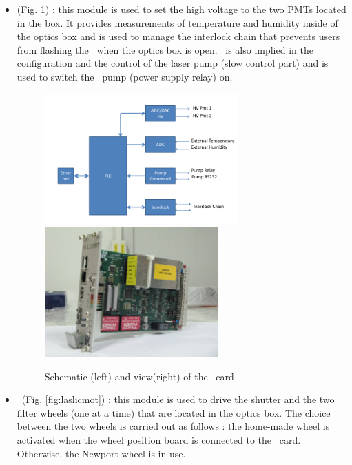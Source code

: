 \begin{itemize}

\item \licpmt (Fig. \ref{fig:laslicpmt}) : this module is used to set the high voltage to the two PMTs located in the box. It provides measurements of temperature and humidity inside of the optics box and is used to manage the interlock chain that prevents users from flashing the \laser~when the optics box is open. \licpmt~is also implied in the configuration and the control of the laser pump (slow control part) and is used to switch the \laser~pump (power supply relay) on. 

\begin{figure}[htbp]
\centering
\includegraphics[height=5cm]{figures/licpmt_scheme.pdf}
\includegraphics[height=5cm]{figures/licpmt.JPG}
\caption{Schematic (left) and view(right) of the \licpmt~card}\label{fig:laslicpmt}
\end{figure}

\item \licmot~(Fig. \ref{fig:laslicmot}) : this module is used to drive the shutter and the two filter wheels (one at a time) that are located in the optics box. The choice between the two wheels is carried out as follows : the home-made wheel is activated when the wheel position board is connected to the \licmot~card. Otherwise, the Newport wheel is in use.


\end{itemize}
